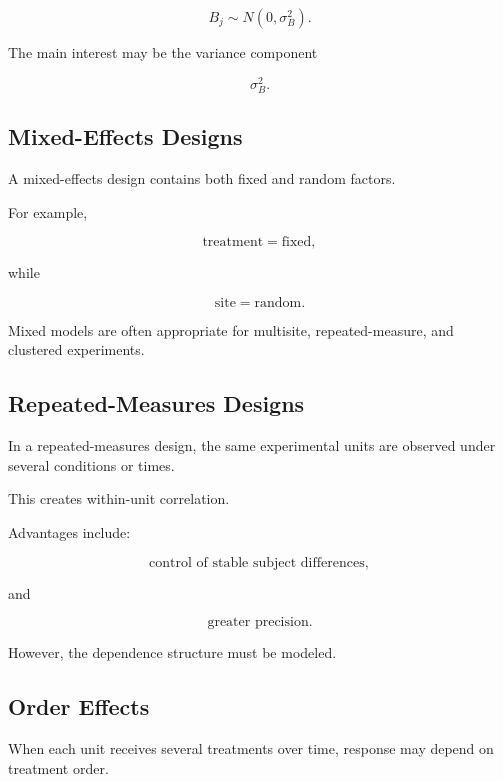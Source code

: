 \[
\boxed{
B_j
\sim
N(0,\sigma_B^2).
}
\]

The main interest may be the variance component

\[
\sigma_B^2.
\]

\subsection{Mixed-Effects Designs}
\label{subsec:mixed-effects-designs}

A mixed-effects design contains both fixed and random factors.

For example,

\[
\boxed{
\text{treatment}
=
\text{fixed},
}
\]

while

\[
\boxed{
\text{site}
=
\text{random}.
}
\]

Mixed models are often appropriate for multisite, repeated-measure, and
clustered experiments.

\subsection{Repeated-Measures Designs}
\label{subsec:repeated-measures-design}

In a repeated-measures design, the same experimental units are observed
under several conditions or times.

This creates within-unit correlation.

Advantages include:

\[
\boxed{
\text{control of stable subject differences},
}
\]

and

\[
\boxed{
\text{greater precision}.
}
\]

However, the dependence structure must be modeled.

\subsection{Order Effects}
\label{subsec:order-effects}

When each unit receives several treatments over time, response may depend
on treatment order.

